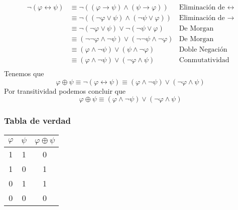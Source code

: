 \documentclass[a4paper]{article}
\begin{document}
\begin{align*}
    \neg \left(\varphi \leftrightarrow \psi\right) &\equiv \neg \left(\left(\varphi \rightarrow \psi\right) \land \left( \psi \rightarrow \varphi  \right)\right) &\text{Eliminación de \(\leftrightarrow\)} \\
                                                   &\equiv  \neg \left(\left(\neg \varphi \lor \psi\right) \land \left( \neg \psi \lor \varphi  \right)\right) &\text{Eliminación de \(\rightarrow\)} \\
                                                   &\equiv  \neg \left(\neg \varphi \lor \psi\right) \lor \neg \left( \neg \psi \lor \varphi  \right) &\text{De Morgan} \\
                                                   &\equiv   \left(\neg\neg \varphi \land \neg \psi\right) \lor \left( \neg \neg \psi \land \neg \varphi  \right) &\text{De Morgan} \\
                                                   &\equiv   \left(\varphi \land \neg \psi\right) \lor \left( \psi \land \neg \varphi  \right) &\text{Doble Negación} \\
                                                   &\equiv   \left(\varphi \land \neg \psi\right) \lor \left( \neg \varphi \land \psi  \right) &\text{Conmutatividad} \\
\end{align*}
Tenemos que
\[
    \varphi \oplus \psi \equiv \neg \left(\varphi \leftrightarrow \psi\right) \equiv   \left(\varphi \land \neg \psi\right) \lor \left( \neg \varphi \land \psi  \right)
\]
Por transitividad podemos concluir que
\[
    \varphi \oplus \psi \equiv \left(\varphi \land \neg \psi\right) \lor \left( \neg \varphi \land \psi  \right)
\]
\subsubsection{Tabla de verdad}
\begin{center}
    \begin{tabular}{ccc}
    $\varphi$ & \(\psi\) & $\varphi \oplus \psi$\\
    \midrule
    1 & 1 & 0 \\
    1 & 0 & 1 \\
    0 & 1 & 1 \\
    0 & 0 & 0 \\
    \end{tabular}
\end{center}
\end{document}
